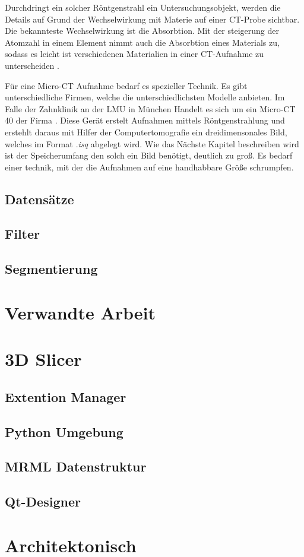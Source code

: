 Durchdringt ein solcher Röntgenstrahl ein Untersuchungsobjekt, werden die Details
auf Grund der Wechselwirkung mit Materie auf einer CT-Probe sichtbar. Die
bekannteste Wechselwirkung ist die Absorbtion. Mit der steigerung der Atomzahl in
einem Element nimmt auch die Absorbtion eines Materials zu, sodass es leicht ist
verschiedenen Materialien in einer CT-Aufnahme zu unterscheiden \citep{nib2024}.

Für eine Micro-CT Aufnahme bedarf es spezieller Technik. Es gibt
unterschiedliche Firmen, welche die unterschiedlichsten Modelle anbieten. Im
Falle der Zahnklinik an der LMU in München Handelt es sich um ein Micro-CT 40
der Firma \citet{scanco2024}. Diese Gerät erstelt Aufnahmen mittels
Röntgenstrahlung und erstehlt daraus mit Hilfer der Computertomografie ein
dreidimensonales Bild, welches im Format \textit{.isq} abgelegt wird. Wie das Nächste
Kapitel beschreiben wird ist der Speicherumfang den solch ein Bild benötigt,
deutlich zu groß. Es bedarf einer technik, mit der die Aufnahmen auf eine
handhabbare Größe schrumpfen.

\subsection{Datensätze}

\subsection{Filter}

\subsection{Segmentierung}

\section{Verwandte Arbeit}
\label{sec:verwwandte_arbeit}

\section{3D Slicer}
\label{sec:3d_slicer}

\subsection{Extention Manager}

\subsection{Python Umgebung}

\subsection{MRML Datenstruktur}

\subsection{Qt-Designer}

\section{Architektonisch}
\label{sec:architektonisch}
